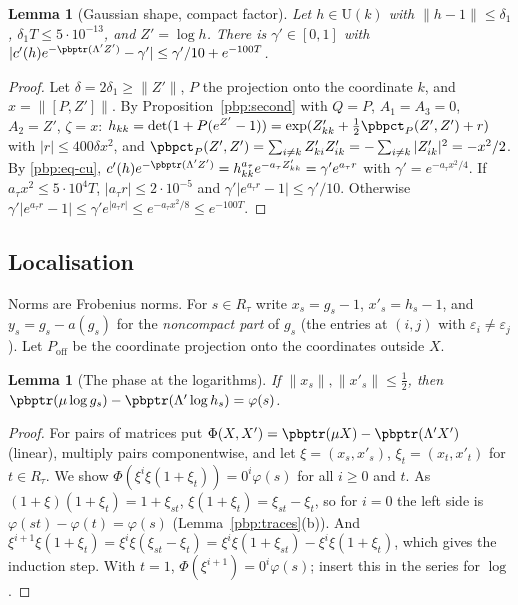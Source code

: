 \documentclass[10pt]{amsart}
\newtheorem{lemma}[theorem]{Lemma}
\theoremstyle{definition}
\theoremstyle{remark}
\providecommand{\auU}{\mathrm U}
\begin{document}
\begin{lemma}[Gaussian shape, compact factor]\label{pbp:compact}
Let $h\in\auU(k)$ with $\|h-1\|\le\delta_1$, $\delta_1T\le5\cdot10^{-13}$, and $Z'=\log h$. There is
$\gamma'\in[0,1]$ with $|c'(h)e^{-\pbptr(\Lambda'Z')}-\gamma'|\le\gamma'/10+e^{-100T}$.
\end{lemma}
\begin{proof}
Let $\delta=2\delta_1\ge\|Z'\|$, $P$ the projection onto the coordinate $k$, and $x=\|[P,Z']\|$. By
Proposition~\ref{pbp:second} with $Q=P$, $A_1=A_3=0$, $A_2=Z'$, $\zeta=x$: $h_{kk}=\det(1+P(e^{Z'}-1))=
\exp(Z'_{kk}+\frac12\pbpct_P(Z',Z')+r)$ with $|r|\le400\delta x^2$, and $\pbpct_P(Z',Z')=\sum_{i\ne k}
Z'_{ki}Z'_{ik}=-\sum_{i\ne k}|Z'_{ik}|^2=-x^2/2$. By \eqref{pbp:eq-cu}, $c'(h)e^{-\pbptr(\Lambda'Z')}=
h_{kk}^{a_\tau}e^{-a_\tau Z'_{kk}}=\gamma'e^{a_\tau r}$ with $\gamma'=e^{-a_\tau x^2/4}$. If $a_\tau x^2\le
5\cdot10^4T$, $|a_\tau r|\le2\cdot10^{-5}$ and $\gamma'|e^{a_\tau r}-1|\le\gamma'/10$. Otherwise
$\gamma'|e^{a_\tau r}-1|\le\gamma'e^{|a_\tau r|}\le e^{-a_\tau x^2/8}\le e^{-100T}$.
\end{proof}

\subsection{Localisation}\label{pbp:ss-loc}

Norms are Frobenius norms. For $s\in R_\tau$ write $x_s=g_s-1$, $x'_s=h_s-1$, and $y_s=g_s-a(g_s)$ for
the \emph{noncompact part} of $g_s$ (the entries at $(i,j)$ with $\varepsilon_i\ne\varepsilon_j$). Let
$P_{\mathrm{off}}$ be the coordinate projection onto the coordinates outside $X$.

\begin{lemma}[The phase at the logarithms]\label{pbp:phaselog}
If $\|x_s\|,\|x'_s\|\le\frac12$, then $\pbptr(\mu\log g_s)-\pbptr(\Lambda'\log h_s)=\varphi(s)$.
\end{lemma}
\begin{proof}
For pairs of matrices put $\Phi(X,X')=\pbptr(\mu X)-\pbptr(\Lambda'X')$ (linear), multiply pairs
componentwise, and let $\xi=(x_s,x'_s)$, $\xi_t=(x_t,x'_t)$ for $t\in R_\tau$. We show $\Phi(\xi^i\xi
(1+\xi_t))=0^i\varphi(s)$ for all $i\ge0$ and $t$. As $(1+\xi)(1+\xi_t)=1+\xi_{st}$, $\xi(1+\xi_t)=\xi_{st}
-\xi_t$, so for $i=0$ the left side is $\varphi(st)-\varphi(t)=\varphi(s)$ (Lemma~\ref{pbp:traces}(b)).
And $\xi^{i+1}\xi(1+\xi_t)=\xi^i\xi(\xi_{st}-\xi_t)=\xi^i\xi(1+\xi_{st})-\xi^i\xi(1+\xi_t)$, which gives the
induction step. With $t=1$, $\Phi(\xi^{i+1})=0^i\varphi(s)$; insert this in the series for $\log$.
\end{proof}
\end{document}
